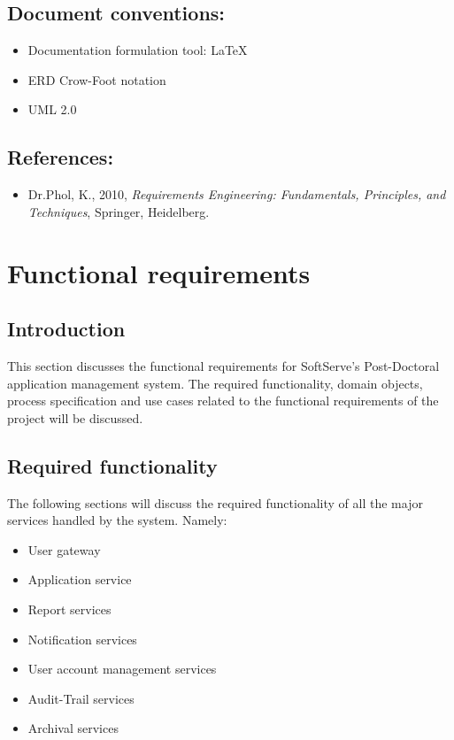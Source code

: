 \documentclass[12pt]{article}
\begin{document}
\vspace{0.5in}

\subsection{Document conventions:}
\vspace{0.1in}
\begin{itemize}
\item Documentation formulation tool: LaTeX
\item ERD Crow-Foot notation
\item UML 2.0
\end{itemize}

\vspace{0.2in}

\subsection{References:}
\vspace{0.1in}
\begin{itemize}
\item Dr.Phol, K., 2010, \textit{Requirements Engineering: Fundamentals, Principles, and Techniques}, Springer, Heidelberg.
\end{itemize}	

\vspace{0.5in}

\newpage
\section{Functional requirements}
\subsection{Introduction} %
\vspace{0.2in}
This section discusses the functional requirements for SoftServe's Post-Doctoral application management system.
The required functionality, domain objects, process specification and use cases related to the functional requirements of the project will be discussed.
\vspace{0.2in}

\subsection{Required functionality} %
\vspace{0.2in}
The following sections will discuss the required functionality of all the major services handled by the system. Namely:
\begin{itemize}
\item User gateway
\item Application service
\item Report services
\item Notification services
\item User account management services
\item Audit-Trail services
\item Archival services
\end{itemize}
\end{document}
